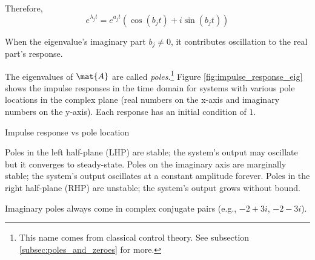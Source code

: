 Therefore,
\begin{equation*}
  e^{\lambda_j t} = e^{a_j t} (\cos(b_j t) + i \sin(b_j t))
\end{equation*}

When the eigenvalue's imaginary part $b_j \neq 0$, it contributes oscillation to
the real part's response.

The eigenvalues of $\mat{A}$ are called \textit{poles}.\footnote{This name comes
from classical control theory. See subsection \ref{subsec:poles_and_zeroes} for
more.} Figure \ref{fig:impulse_response_eig} shows the \glspl{impulse response}
in the time domain for \glspl{system} with various pole locations in the complex
plane (real numbers on the x-axis and imaginary numbers on the y-axis). Each
response has an initial condition of $1$.
\begin{bookfigure}
  
  \caption{Impulse response vs pole location}
  \label{fig:impulse_response_eig}
\end{bookfigure}

Poles in the left half-plane (LHP) are stable; the \gls{system}'s output may
oscillate but it converges to steady-state. Poles on the imaginary axis are
marginally stable; the \gls{system}'s output oscillates at a constant amplitude
forever. Poles in the right half-plane (RHP) are unstable; the \gls{system}'s
output grows without bound.
\begin{remark}
  Imaginary poles always come in complex conjugate pairs (e.g., $-2 + 3i$,
  $-2 - 3i$).
\end{remark}
